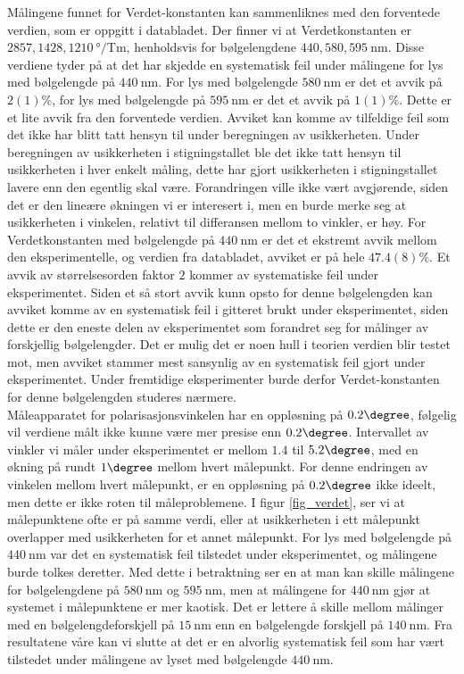 \documentclass[%
 reprint,
nofootinbib,
aps,
]{revtex4-1}
\begin{document}
Målingene funnet for Verdet-konstanten kan sammenliknes med den forventede verdien, som er oppgitt i databladet. Der finner vi at Verdetkonstanten er $2857, 1428, \SI{1210}{\degree/\tesla\meter}$, henholdsvis for bølgelengdene $440, 580, \SI{595}{\nano\meter}$. Disse verdiene tyder på at det har skjedde en systematisk feil under målingene for lys med bølgelengde på $\SI{440}{\nano\meter}$. For lys med bølgelengde $\SI{580}{\nano\meter}$ er det et avvik på $2(1)\%$, for lys med bølgelengde på $\SI{595}{\nano\meter}$ er det et avvik på $1(1)\%$. Dette er et lite avvik fra den forventede verdien. Avviket kan komme av tilfeldige feil som det ikke har blitt tatt hensyn til under beregningen av usikkerheten. Under beregningen av usikkerheten i stigningstallet ble det ikke tatt hensyn til usikkerheten i hver enkelt måling, dette har gjort usikkerheten i stigningstallet lavere enn den egentlig skal være. Forandringen ville ikke vært avgjørende, siden det er den lineære økningen vi er interesert i, men en burde merke seg at usikkerheten i vinkelen, relativt til differansen mellom to vinkler, er høy.
For Verdetkonstanten med bølgelengde på $\SI{440}{\nano\meter}$ er det et ekstremt avvik mellom den eksperimentelle, og verdien fra databladet, avviket er på hele $47.4(8)\%$. Et avvik av størrelsesorden faktor $2$ kommer av systematiske feil under eksperimentet. Siden et så stort avvik kunn opsto for denne bølgelengden kan avviket komme av en systematisk feil i gitteret brukt under eksperimentet, siden dette er den eneste delen av eksperimentet som forandret seg for målinger av forskjellig bølgelengder. Det er mulig det er noen hull i teorien verdien blir testet mot, men avviket stammer mest sansynlig av en systematisk feil gjort under eksperimentet. Under fremtidige eksperimenter burde derfor Verdet-konstanten for denne bølgelengden studeres nærmere.\\
Måleapparatet for polarisasjonsvinkelen har en oppløsning på $0.2\degree$, følgelig vil verdiene målt ikke kunne være mer presise enn $0.2\degree$. Intervallet av vinkler vi måler under eksperimentet er mellom $1.4$ til $5.2\degree$, med en økning på rundt $1\degree$ mellom hvert målepunkt. For denne endringen av vinkelen mellom hvert målepunkt, er en oppløsning på $0.2\degree$ ikke ideelt, men dette er ikke roten til måleproblemene.
I figur \vref{fig_verdet}, ser vi at målepunktene ofte er på samme verdi, eller at usikkerheten i ett målepunkt overlapper med usikkerheten for et annet målepunkt. For lys med bølgelengde på $\SI{440}{\nano\meter}$ var det en systematisk feil tilstedet under eksperimentet, og målingene burde tolkes deretter. Med dette i betraktning ser en at man kan skille målingene for bølgelengdene på $\SI{580}{\nano\meter}$ og $\SI{595}{\nano\meter}$, men at målingene for $\SI{440}{\nano\meter}$ gjør at systemet i målepunktene er mer kaotisk. Det er lettere å skille mellom målinger med en bølgelengdeforskjell på $\SI{15}{\nano\meter}$ enn en bølgelengde forskjell på $\SI{140}{\nano\meter}$.
Fra resultatene våre kan vi slutte at det er en alvorlig systematisk feil som har vært tilstedet under målingene av lyset med bølgelengde $\SI{440}{\nano\meter}$.
\end{document}
